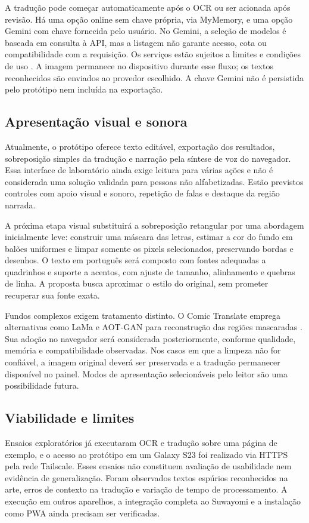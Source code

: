 \documentclass[conference]{IEEEtran}
\begin{document}
A tradução pode começar automaticamente após o OCR ou ser acionada após revisão. Há uma opção online sem chave própria, via MyMemory, e uma opção Gemini com chave fornecida pelo usuário. No Gemini, a seleção de modelos é baseada em consulta à API, mas a listagem não garante acesso, cota ou compatibilidade com a requisição. Os serviços estão sujeitos a limites e condições de uso \cite{mymemory,gemini}. A imagem permanece no dispositivo durante esse fluxo; os textos reconhecidos são enviados ao provedor escolhido. A chave Gemini não é persistida pelo protótipo nem incluída na exportação.

\subsection{Apresentação visual e sonora}
Atualmente, o protótipo oferece texto editável, exportação dos resultados, sobreposição simples da tradução e narração pela síntese de voz do navegador. Essa interface de laboratório ainda exige leitura para várias ações e não é considerada uma solução validada para pessoas não alfabetizadas. Estão previstos controles com apoio visual e sonoro, repetição de falas e destaque da região narrada.

A próxima etapa visual substituirá a sobreposição retangular por uma abordagem inicialmente leve: construir uma máscara das letras, estimar a cor do fundo em balões uniformes e limpar somente os pixels selecionados, preservando bordas e desenhos. O texto em português será composto com fontes adequadas a quadrinhos e suporte a acentos, com ajuste de tamanho, alinhamento e quebras de linha. A proposta busca aproximar o estilo do original, sem prometer recuperar sua fonte exata.

Fundos complexos exigem tratamento distinto. O Comic Translate emprega alternativas como LaMa e AOT-GAN para reconstrução das regiões mascaradas \cite{comictranslate}. Sua adoção no navegador será considerada posteriormente, conforme qualidade, memória e compatibilidade observadas. Nos casos em que a limpeza não for confiável, a imagem original deverá ser preservada e a tradução permanecer disponível no painel. Modos de apresentação selecionáveis pelo leitor são uma possibilidade futura.

\subsection{Viabilidade e limites}
Ensaios exploratórios já executaram OCR e tradução sobre uma página de exemplo, e o acesso ao protótipo em um Galaxy S23 foi realizado via HTTPS pela rede Tailscale. Esses ensaios não constituem avaliação de usabilidade nem evidência de generalização. Foram observados textos espúrios reconhecidos na arte, erros de contexto na tradução e variação de tempo de processamento. A execução em outros aparelhos, a integração completa ao Suwayomi e a instalação como PWA ainda precisam ser verificadas.
\end{document}
